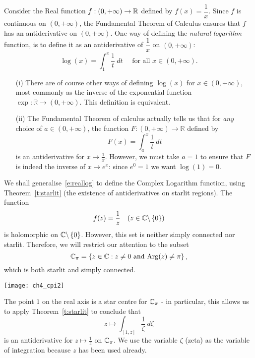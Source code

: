 Consider the Real function $f:(0,+\infty) \to \mathbb{R}$ defined by $f(x) = \dfrac{1}{x}$. Since $f$ is continuous on $(0,+\infty)$, the Fundamental Theorem of Calculus ensures that $f$ has an antiderivative on $(0,+\infty)$.  One way of defining the \emph{natural logarithm} function, is to define it as an antiderivative of $\dfrac{1}{x}$ on $(0,+\infty)$:
\begin{equation}
\label{e:reallog}
\log (x) = \int_1^x \frac{1}{t}\ dt \quad \text{ for all } x \in (0,+\infty).
\end{equation}
\begin{note}
\begin{enumerate}
\item[(i)] There are of course other ways of defining $\log (x)$ for $x \in (0,+\infty)$, most commonly as the inverse of the exponential function $\exp:\mathbb{R} \to (0,+\infty)$.  This definition is equivalent.
\item[(ii)]  The Fundamental Theorem of calculus actually tells us that for \emph{any} choice of $a \in (0,+\infty)$, the function $F: (0,+\infty) \to \mathbb{R}$ defined by
\[
F(x) = \int_a^x \frac{1}{t}\ dt
\]
is an antiderivative for $x \mapsto \frac{1}{x}$.  However, we must take $a=1$ to ensure that $F$ is indeed the inverse of $x \mapsto e^x$: since $e^0=1$ we want $\log (1)=0$.
\end{enumerate}
\end{note}
We shall generalise~\eqref{e:reallog} to define the Complex Logarithm function, using Theorem~\ref{t:starlit} (the existence of antiderivatives on starlit regions).  The function
\[
f(z) = \frac{1}{z}\quad (z \in \mathbb{C} \backslash \left\{0\right\})
\]
is holomorphic on $\mathbb{C} \backslash \left\{0\right\}$. However, this set is neither simply connected nor starlit.  Therefore, we will restrict our attention to the subset
\[
\mathbb{C}_{\pi} = \left\{ z \in \mathbb{C}: z \neq 0 \text{ and } \mathrm{Arg}(z) \neq \pi \right\},
\]
which is both starlit and simply connected. 
\begin{center}
\texttt{[image: ch4\_cpi2]}
\end{center}
 The point $1$ on the real axis is a star centre for $\mathbb{C}_{\pi}$ - in particular, this allows us to apply Theorem~\ref{t:starlit} to conclude that
\[
z \mapsto \int_{[1,z]} \frac{1}{\zeta}\ d \zeta
\]
is an antiderivative for $z \mapsto \frac{1}{z}$ on $\mathbb{C}_{\pi}$.  We use the variable $\zeta$ (zeta) as the variable of integration because $z$ has been used already.

